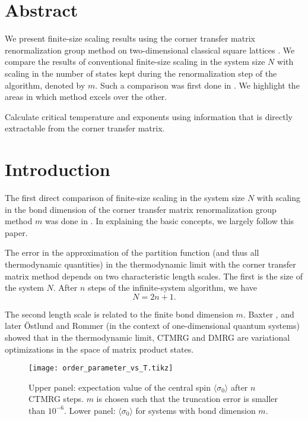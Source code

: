 \section{Abstract}


We present finite-size scaling results using the corner transfer matrix renormalization
group method on two-dimensional classical square lattices \cite{nishino1996corner}. We
compare the results of conventional finite-size scaling in the system size $N$ with
scaling in the number of states kept during the renormalization step of the algorithm,
denoted by $m$. Such a comparison was first done in \cite{nishino1996numerical}. We
highlight the areas in which method excels over the other.

Calculate critical temperature and exponents using information that is directly
extractable from the corner transfer matrix.


\section{Introduction}

The first direct comparison of finite-size scaling in the system size $N$ with scaling in
the bond dimension of the corner transfer matrix renormalization group method $m$ was done
in \cite{nishino1996numerical}. In explaining the basic concepts, we largely follow this
paper.

The error in the approximation of the partition function (and thus all thermodynamic
quantities) in the thermodynamic limit with the corner transfer matrix method depends on
two characteristic length
scales. The first is the size of the system $N$. After $n$ steps of the infinite-system
algorithm, we have
\begin{equation}
  N = 2n + 1.
\end{equation}

The second length scale is related to the finite bond dimension $m$. Baxter
\cite{baxter1978variational}, and later Östlund and Rommer \cite{ostlund1995thermodynamic}
(in the context of one-dimensional quantum systems) showed that in the thermodynamic
limit, CTMRG and DMRG are variational optimizations in the space of matrix product states.

\begin{figure}
\texttt{[image: order\_parameter\_vs\_T.tikz]}
\caption{Upper panel: expectation value of the central spin $\langle \sigma_0 \rangle$
  after $n$ CTMRG steps. $m$ is chosen such that the truncation error is smaller than
  $10^{-6}$. Lower panel: $\langle \sigma_0 \rangle$ for systems with bond dimension $m$.}\label{fig:order_parameter_vs_T}
\end{figure}

